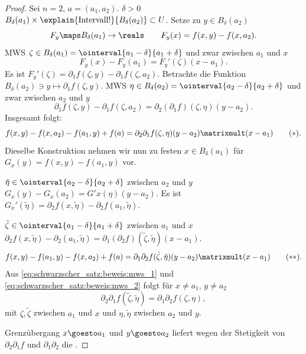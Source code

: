 \begin{proof}
  Sei \obda \( n=2 \), \( a=(a_1,a_2) \). \texists \( \delta>0 \) \sd \( B_{\delta}(a_1)\times \explain{\text{Intervall!}}{B_{\delta}(a_2)}\subset U \). Setze zu \( y\in B_\delta(a_2) \)
  \begin{equation*}
    F_y\maps B_\delta(a_1)\to \reals\qquad F_y(x)=f(x,y)-f(x,a_2).
  \end{equation*}
  MWS \timplies \texists  \( \zeta\in B_\delta(a_1)=\ointerval{a_1-\delta}{a_1+\delta} \) und zwar zwischen \( a_1 \) und \( x \) \sd 
  \begin{equation*}
    F_y(x)-F_y(a_1)=F_y'(\zeta)(x-a_1).
  \end{equation*}
  Es ist \( F_y'(\zeta)=\partial_1 f(\zeta,y)-\partial_1 f(\zeta,a_2) \). Betrachte die Funktion \( B_\delta(a_2)\ni y\mapsto \partial_1 f(\zeta,y) \). MWS \timplies \texists \( \eta\in B_\delta(a_2)=\ointerval{a_2-\delta}{a_2+\delta} \) und zwar zwischen \( a_2 \) und \( y \) \sd
  \begin{equation*}
    \partial_1 f(\zeta,y)-\partial_1 f(\zeta,a_2)=\partial_2 (\partial_1 f)(\zeta,\eta)(y-a_2).
  \end{equation*}
  Insgesamt folgt:
  \begin{equation*}
    f(x,y)-f(x,a_2)-f(a_1,y)+f(a)=\partial_2\partial_1 f(\zeta,\eta)(y-a_2)\matrixmult(x-a_1)\tag{\(*\)}.\label{eq:schwarzscher_satz:beweis:mws_1}
  \end{equation*}
  Dieselbe Konstruktion nehmen wir nun zu festen \( x\in B_\delta(a_1) \) für \( G_x(y)=f(x,y)-f(a_1,y) \) vor.

  \texists \( \tilde{\eta}\in \ointerval{a_2-\delta}{a_2+\delta} \) zwischen \( a_2 \) und \( y \) \sd \( G_x(y)-G_x(a_2)=G'x(\eta)(y-a_2) \). Es ist \( G_x'(\tilde{\eta})=\partial_2 f(x,\tilde{\eta})-\partial_2 f(a_1,\tilde{\eta}) \).

  \texists \( \tilde{\zeta}\in \ointerval{a_1-\delta}{a_1+\delta} \) zwischen \( a_1  \) und \( x \) \sd\( \partial_2 f(x,\tilde{\eta})-\partial_2(a_1,\tilde{\eta})=\partial_1(\partial_2 f)(\tilde{\zeta},\tilde{\eta})(x-a_1) \).
  \begin{equation}
    f(x,y)-f(a_1,y)-f(x,a_2)+f(a)=\partial_1 \partial_2 f(\tilde{\zeta},\tilde{\eta})(y-a_2)\matrixmult(x-a_1)\tag{\(**\)}.\label{eq:schwarzscher_satz:beweis:mws_2}
  \end{equation}
  Aus \eqref{eq:schwarzscher_satz:beweis:mws_1} und \eqref{eq:schwarzscher_satz:beweis:mws_2} folgt für \( x\neq a_1 \), \( y\neq a_2 \)
  \begin{equation*}
    \partial_2 \partial_1 f(\tilde{\zeta},\tilde{\eta})=\partial_1 \partial_2 f(\zeta,\eta),
  \end{equation*}
  mit \( \zeta,\tilde{\zeta} \) zwischen \( a_1 \) und \( x \) und \( \eta,\tilde{\eta} \) zwischen \( a_2  \) und \( y \).

  Grenzübergang \( x\goesto a_1 \) und \( y\goesto a_2 \) liefert wegen der Stetigkeit von \( \partial_2\partial_1 f \) und \( \partial_1 \partial_2  \) die \Beh.
\end{proof}
